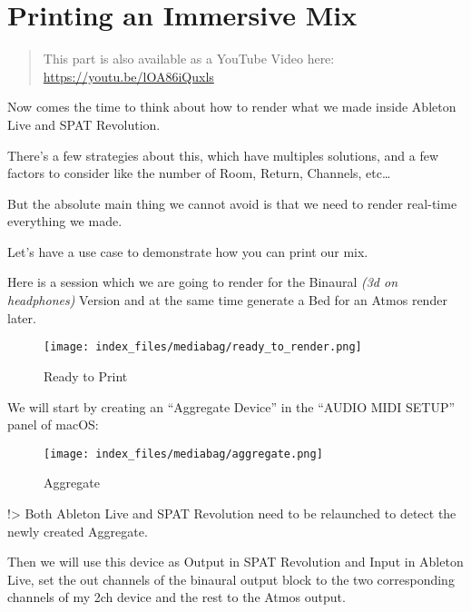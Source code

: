 \documentclass[
  letterpaper,
  DIV=11,
  numbers=noendperiod]{scrreport}
\begin{document}
\hypertarget{printing-an-immersive-mix}{%
\section{Printing an Immersive Mix}\label{printing-an-immersive-mix}}

\begin{quote}
This part is also available as a YouTube Video here:
\url{https://youtu.be/lOA86iQuxls}
\end{quote}

Now comes the time to think about how to render what we made inside
Ableton Live and SPAT Revolution.

There's a few strategies about this, which have multiples solutions, and
a few factors to consider like the number of Room, Return, Channels,
etc\ldots{}

But the absolute main thing we cannot avoid is that we need to render
real-time everything we made.

Let's have a use case to demonstrate how you can print our mix.

Here is a session which we are going to render for the Binaural
\emph{(3d on headphones)} Version and at the same time generate a Bed
for an Atmos render later.

\begin{figure}

{\centering \texttt{[image: index\_files/mediabag/ready\_to\_render.png]}

}

\caption{Ready to Print}

\end{figure}

We will start by creating an ``Aggregate Device'' in the ``AUDIO MIDI
SETUP'' panel of macOS:

\begin{figure}

{\centering \texttt{[image: index\_files/mediabag/aggregate.png]}

}

\caption{Aggregate}

\end{figure}

!\textgreater{} Both Ableton Live and SPAT Revolution need to be
relaunched to detect the newly created Aggregate.

Then we will use this device as Output in SPAT Revolution and Input in
Ableton Live, set the out channels of the binaural output block to the
two corresponding channels of my 2ch device and the rest to the Atmos
output.
\end{document}
